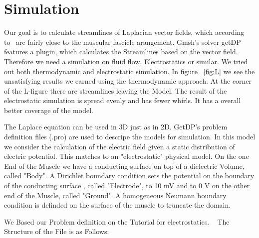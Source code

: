 \documentclass[preprint,journal]{vgtc}       %
\begin{document}
\section{Simulation}
Our goal is to calculate streamlines of Laplacian vector fields, which according to~\cite{Choi2013} are fairly close to the muscular fascicle arangement. %
Gmsh's solver getDP features a plugin, which calculates the Streamlines based on the vector field. 
Therefore we need a simulation on fluid flow, Electrostatics or similar. %
We tried out both thermodynamic and electrostatic simulation. 
In figure ~\ref{fig:L} we see the unsatisfying results we earned using the thermodynamic approach. 
At the corner of the L-figure there are streamlines leaving the Model. 
The result of the electrostatic simulation is spread evenly and has fewer whirls. 
It has a overall better coverage of the model.

The Laplace equation can be used in 3D just as in 2D. 
GetDP's problem definition files (.pro) are used to descripe the models for simulation. 
In this model we consider the calculation of the electric field given a static distribution of electric potentiol. 
This matches to an "electrostatic" physical model. 
On the one End of the Muscle we have a conducting surface on top of a dielectric Volume, called "Body".
A Dirichlet boundary condition sets the potential on the boundary of the conducting surface , called "Electrode", to 10 mV and to 0 V on the other end of the Muscle, called "Ground".
A homogeneous Neumann boundary condition is definded on the surface of the muscle to truncate the domain.

We Based our Problem definition on the Tutorial for electrostatics. ~\cite{Geuzaine2009}
The Structure of the File is as Follows:
\end{document}
